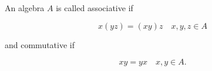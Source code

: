 An algebra $A$ is called associative if

$$x(yz) = (xy)z \quad x,y,z \in A$$

and commutative if

$$xy = yx \quad x,y \in A.$$
